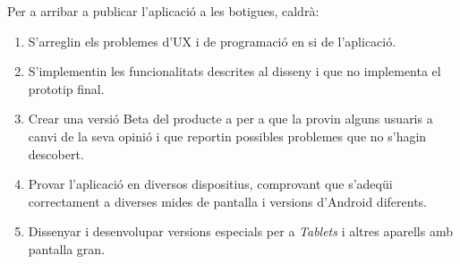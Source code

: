 Per a arribar a publicar l'aplicació a les botigues, caldrà:

\begin{enumerate}
\item S'arreglin els problemes d'\ac{UX} i de programació en si de l'aplicació. %
\item S'implementin les funcionalitats descrites al disseny i que no implementa el prototip final. %
\item Crear una versió Beta del producte a per a que la provin alguns usuaris a canvi de la seva opinió i que reportin possibles problemes que no s'hagin descobert.
\item Provar l'aplicació en diversos dispositius, comprovant que s'adeqüi correctament a diverses mides de pantalla i versions d'\gls{Android} diferents.
\item Dissenyar i desenvolupar versions especials per a \textit{Tablets} i altres aparells amb pantalla gran. 
\end{enumerate}
